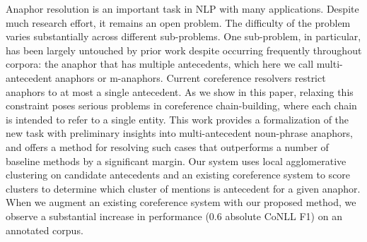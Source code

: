 Anaphor resolution is an important task in NLP with many applications. Despite much research effort, it remains an open problem. The difficulty of the problem varies substantially across different sub-problems. One sub-problem, in particular, has been largely untouched by prior work despite occurring frequently throughout corpora: the anaphor that has multiple antecedents, which here we call multi-antecedent anaphors or m-anaphors. Current coreference resolvers restrict anaphors to at most a single antecedent. As we show in this paper, relaxing this constraint poses serious problems in coreference chain-building, where each chain is intended to refer to a single entity. This work provides a formalization of the new task with preliminary insights into multi-antecedent noun-phrase anaphors, and offers a method for resolving such cases that outperforms a number of baseline methods by a significant margin. Our system uses local agglomerative clustering on candidate antecedents and an existing coreference system to score clusters to determine which cluster of mentions is antecedent for a given anaphor. When we augment an existing coreference system with our proposed method, we observe a substantial increase in performance (0.6 absolute CoNLL F1) on an annotated corpus.
